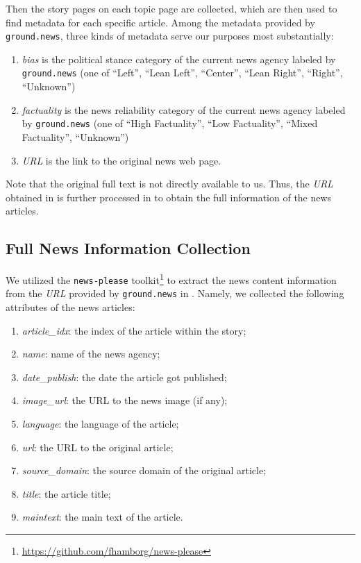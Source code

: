 Then the story pages on each topic page are collected, which are then used to find metadata for each specific article. 
Among the metadata provided by \texttt{ground.news}, three kinds of metadata serve our purposes most substantially:
\begin{enumerate}
    \item \textit{bias} is the political stance category of the current news agency labeled by \texttt{ground.news} (one of ``Left'', ``Lean Left'', ``Center'', ``Lean Right'', ``Right'', ``Unknown'')
    \item \textit{factuality} is the news reliability category of the current news agency labeled by \texttt{ground.news} (one of ``High Factuality'', ``Low Factuality'', ``Mixed Factuality'', ``Unknown'')
    \item \textit{URL} is the link to the original news web page.
\end{enumerate}

Note that the original full text is not directly available to us. Thus, the \textit{URL} obtained in  is further processed in  to obtain the full information of the news articles.


\subsection{Full News Information Collection}
\label{full-news}
We utilized the \texttt{news-please} toolkit\footnote{\url{https://github.com/fhamborg/news-please}} to extract the news content information from the \textit{URL} provided by \texttt{ground.news} in . Namely, we collected the following attributes of the news articles:
\begin{enumerate}
    \item \textit{article\_idx}: the index of the article within the story;
    \item \textit{name}: name of the news agency;
    \item \textit{date\_publish}: the date the article got published;
    \item \textit{image\_url}: the URL to the news image (if any);
    \item \textit{language}: the language of the article;
    \item \textit{url}: the URL to the original article;
    \item \textit{source\_domain}: the source domain of the original article;
    \item \textit{title}: the article title;
    \item \textit{maintext}: the main text of the article.
\end{enumerate}

